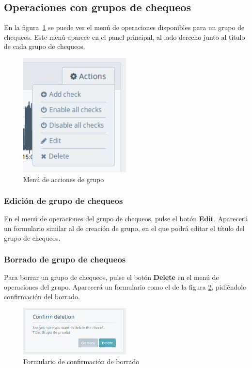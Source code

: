 \subsection{Operaciones con grupos de chequeos}

En la figura~\ref{fig:operaciones-grupo} se puede ver el menú de operaciones
disponibles para un grupo de chequeos. Este menú aparece en el panel principal,
al lado derecho junto al título de cada grupo de chequeos.

\begin{figure}[hbtp]
  \centering
  \includegraphics[width=0.5\textwidth]{apendice_manual_usuario/grupo_submenu_acciones.png}
  \caption{Menú de acciones de grupo}
  \label{fig:operaciones-grupo}
\end{figure}

\subsubsection{Edición de grupo de chequeos}

En el menú de operaciones del grupo de chequeos, pulse el botón
\textbf{Edit}. Aparecerá un formulario similar al de creación de grupo, en el
que podrá editar el título del grupo de chequeos.

\subsubsection{Borrado de grupo de chequeos}

Para borrar un grupo de chequeos, pulse el botón \textbf{Delete} en el menú de
operaciones del grupo. Aparecerá un formulario como el de la figura
\ref{fig:formulario-borrado-grupo}, pidiéndole confirmación del borrado. 

\begin{figure}[hbtp]
  \centering
  \includegraphics[width=0.5\textwidth]{apendice_manual_usuario/formulario_borrado_grupo}
  \caption{Formulario de confirmación de borrado}
  \label{fig:formulario-borrado-grupo}
\end{figure}

